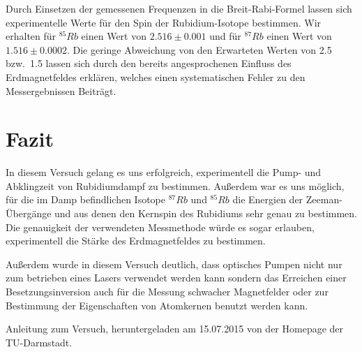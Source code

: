 \documentclass[bigchapter,colorback,accentcolor=tud4b,linedtoc,11pt]{tudreport}
\begin{document}
Durch Einsetzen der gemessenen Frequenzen in die Breit-Rabi-Formel lassen sich
experimentelle Werte für den Spin der Rubidium-Isotope bestimmen. Wir erhalten
für $^{85}Rb$ einen Wert von $2.516 \pm 0.001$ und für $^{87}Rb$ einen Wert von
$1.516 \pm 0.0002$. Die geringe Abweichung von den Erwarteten Werten von 2.5
bzw.\ 1.5 lassen sich durch den bereits angesprochenen Einfluss des
Erdmagnetfeldes erklären, welches einen systematischen Fehler zu den
Messergebnissen Beiträgt.


\chapter{Fazit}
In diesem Versuch gelang es uns erfolgreich, experimentell die Pump- und
Abklingzeit von Rubidiumdampf zu bestimmen. Außerdem war es uns möglich, für die
im Damp befindlichen Isotope $^{87}Rb$ und $^{85}Rb$ die Energien der
Zeeman-Übergänge und aus denen den Kernspin des Rubidiums sehr genau zu bestimmen. Die
genauigkeit der verwendeten Messmethode würde es sogar erlauben, experimentell
die Stärke des Erdmagnetfeldes zu bestimmen.

Außerdem wurde in diesem Versuch deutlich, dass optisches Pumpen nicht nur
zum betrieben eines Lasers verwendet werden kann sondern das Erreichen einer
Besetzungsinversion auch für die Messung schwacher Magnetfelder oder zur
Bestimmung der Eigenschaften von Atomkernen benutzt werden kann.

\cleardoublepage{}
\newpage
\begin{thebibliography}{100}
   {Anleitung zum Versuch, heruntergeladen am 15.07.2015 von der Homepage der TU-Darmstadt.} 
\end{thebibliography}
\end{document}
